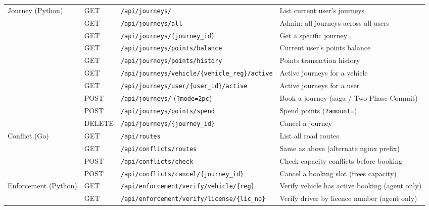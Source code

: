\documentclass[11pt,a4paper]{article}
\begin{document}
\begin{table}[H]
\begin{tabularx}{\textwidth}{L{1.6cm} @{\hspace{6pt}} L{1.1cm} @{\hspace{6pt}} L{6.2cm} @{\hspace{6pt}} X}
  Journey (Python)
    & GET    & \texttt{/api/journeys/}                                      & List current user's journeys \\
    & GET    & \texttt{/api/journeys/all}                                   & Admin: all journeys across all users \\
    & GET    & \texttt{/api/journeys/\{journey\_id\}}                       & Get a specific journey \\
    & GET    & \texttt{/api/journeys/points/balance}                        & Current user's points balance \\
    & GET    & \texttt{/api/journeys/points/history}                        & Points transaction history \\
    & GET    & \texttt{/api/journeys/vehicle/\{vehicle\_reg\}/active}       & Active journeys for a vehicle \\
    & GET    & \texttt{/api/journeys/user/\{user\_id\}/active}              & Active journeys for a user \\
    & POST   & \texttt{/api/journeys/} (\texttt{?mode=2pc})                 & Book a journey (saga / Two-Phase Commit) \\
    & POST   & \texttt{/api/journeys/points/spend}                          & Spend points (\texttt{?amount=}) \\
    & DELETE & \texttt{/api/journeys/\{journey\_id\}}                       & Cancel a journey \\
  \midrule
 
  Conflict (Go)
    & GET    & \texttt{/api/routes}                                         & List all road routes \\
    & GET    & \texttt{/api/conflicts/routes}                               & Same as above (alternate nginx prefix) \\
    & POST   & \texttt{/api/conflicts/check}                                & Check capacity conflicts before booking \\
    & POST   & \texttt{/api/conflicts/cancel/\{journey\_id\}}               & Cancel a booking slot (frees capacity) \\
  \midrule
 
  Enforcement (Python)
    & GET    & \texttt{/api/enforcement/verify/vehicle/\{reg\}}    & Verify vehicle has active booking (agent only) \\
    & GET    & \texttt{/api/enforcement/verify/license/\{lic\_no\}} & Verify driver by licence number (agent only) \\
  \midrule
 

\end{tabularx}
\end{table}
\end{document}
